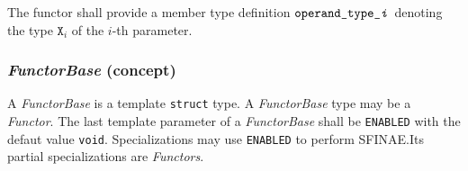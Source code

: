 The functor shall provide a member type                     definition
$\texttt{operand\_type\_\textit{i}}$ denoting the type  $\texttt{X}_i$
of the $i$-th parameter.

\subsubsection{\textit{FunctorBase} (concept)}
A \textit{FunctorBase} is a template \texttt{struct} type. A  \textit{
FunctorBase} type may be a \textit{Functor}. The last         template
parameter of a \textit{FunctorBase} shall be \texttt{ENABLED}     with
the defaut  value \texttt{void}. Specializations may               use
\texttt{ENABLED} to perform SFINAE.Its partial specializations     are
\textit{Functors}. 
